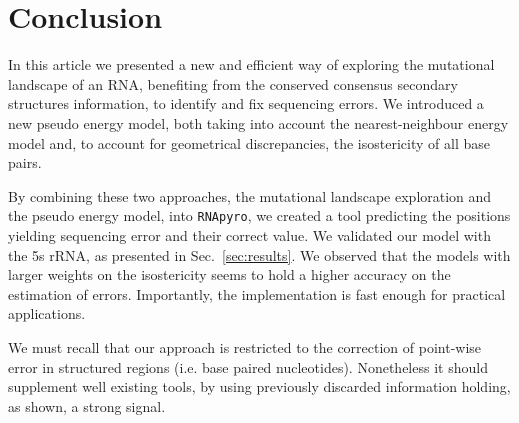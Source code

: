 \section{Conclusion}
\label{sec:conclusion}

In this article we presented a new and efficient way of
exploring the mutational landscape of an RNA, benefiting from the
 conserved consensus secondary structures  information,
to identify and fix sequencing errors. We introduced a new
 pseudo energy model, both taking into account the nearest-neighbour energy model 
and, to account for geometrical discrepancies,  the isostericity of all base pairs. 

By combining these two approaches,  the 
mutational landscape exploration and the pseudo energy model,
 into \texttt{RNApyro}, we created a tool predicting the positions
 yielding sequencing error and their correct value.
We validated our model with the 5s rRNA,
as presented in Sec.~\ref{sec:results}.
We observed that the models
with larger weights on the
isostericity seems to hold a higher accuracy on the estimation of errors.
Importantly, the implementation is fast enough for practical applications. 


We must recall that our approach is restricted to
 the correction of point-wise error in structured regions (i.e. base paired nucleotides).
 Nonetheless it should supplement well existing tools, by using previously discarded
information holding, as shown, a strong signal.

